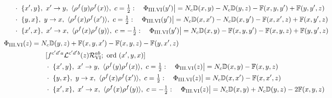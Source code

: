 \documentclass[9pt]{article}
\def\mf#1{\mathbb{#1}}
\numberwithin{equation}{section}
\begin{document}
{\begin{align}
&\qquad\cdot\ \{x',y\},\ x'\to y,\ \langle\rho^{f}(y)\rho^{f}(x)\rangle,\ c=\tfrac{1}{2}:\quad \Phi_{\rm III.VI}(y')\big|=N_{c}\mf{D}(x,y)-N_{c}\mf{D}(y,z)-\mf{F}(x,y,y')+\mf{F}(y,y',z)\notag\\
&\qquad\cdot\ \{y,x\},\ y\to x,\ \langle\rho^{f}(x)\rho^{f}(x')\rangle,\ c=\tfrac{1}{2}:\quad \Phi_{\rm III.VI}(y')\big|=N_{c}\mf{D}(x,x')-N_{c}\mf{D}(x,y')-\mf{F}(x,x',z)+\mf{F}(x,y',z)\notag\\
&\qquad\cdot\ \{x',x\},\ x'\to x,\ \langle\rho^{f}(x)\rho^{f}(y)\rangle,\ c=-\tfrac{1}{2}:\quad \Phi_{\rm III.VI}(y')\big|=N_{c}\mf{D}(x,y)-\mf{F}(x,y,y')-\mf{F}(x,y,z)+\mf{F}(y,y',z)\notag
\end{align}
\begin{align}
\Phi_{\rm III.VI}(z)&=N_{c}\mf{D}(y,z)+\mf{F}(x,y,x')-\mf{F}(x,y,z)-\mf{F}(y,x',z)\notag\\&\qquad[f^{c'd'a}\mathcal{L}^{c'd'b}(z)\mathcal{R}_{\rm VI}^{ab};\ \text{ord}\ (x',y,x)]\notag\\
&\qquad\cdot\ \{x',y\},\ x'\to y,\ \langle\rho^{f}(y)\rho^{f}(x)\rangle,\ c=\tfrac{1}{2}:\quad \Phi_{\rm III.VI}(z)\big|=N_{c}\mf{D}(x,y)-\mf{F}(x,y,z)\notag\\
&\qquad\cdot\ \{y,x\},\ y\to x,\ \langle\rho^{f}(x)\rho^{f}(x')\rangle,\ c=\tfrac{1}{2}:\quad \Phi_{\rm III.VI}(z)\big|=N_{c}\mf{D}(x,x')-\mf{F}(x,x',z)\notag\\
&\qquad\cdot\ \{x',x\},\ x'\to x,\ \langle\rho^{f}(x)\rho^{f}(y)\rangle,\ c=-\tfrac{1}{2}:\quad \Phi_{\rm III.VI}(z)\big|=N_{c}\mf{D}(x,y)+N_{c}\mf{D}(y,z)-2\mf{F}(x,y,z)\notag
\end{align}

}
\end{document}
